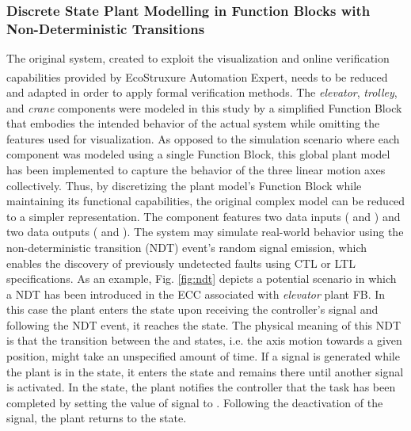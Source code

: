 \begin{bibunit}
\subsubsection*{Discrete State Plant Modelling in Function Blocks with Non-Deterministic Transitions}
The original system, created to exploit the visualization and online verification capabilities provided by EcoStruxure\textsuperscript{\texttrademark} Automation Expert, needs to be reduced and adapted in order to apply formal verification methods. The \textit{elevator}, \textit{trolley}, and \textit{crane} components were modeled in this study by a simplified Function Block that embodies the intended behavior of the actual system while omitting the features used for visualization. As opposed to the simulation scenario where each component was modeled using a single Function Block, this global plant model has been implemented to capture the behavior of the three linear motion axes collectively.
Thus, by discretizing the plant model's Function Block while maintaining its functional capabilities, the original complex model can be reduced to a simpler representation.
The  component features two data inputs ( and ) and two data outputs ( and ).
The system may simulate real-world behavior using the non-deterministic transition (NDT) event's random signal emission, which enables the discovery of previously undetected faults using CTL or LTL specifications.
As an example, Fig. \ref{fig:ndt} depicts a potential scenario in which a NDT has been introduced in the ECC associated with \textit{elevator} plant FB.
In this case the plant enters the  state upon receiving the controller's  signal and following the NDT event, it reaches the  state.
The physical meaning of this NDT is that the transition between the  and  states, i.e. the axis motion towards a given position, might take an unspecified amount of time.
If a  signal is generated while the plant is in the  state, it enters the  state and remains there until another  signal is activated.
In the  state, the plant notifies the controller that the task has been completed by setting the value of   signal to . 
Following the deactivation of the  signal, the plant returns to the  state.


\end{bibunit}
